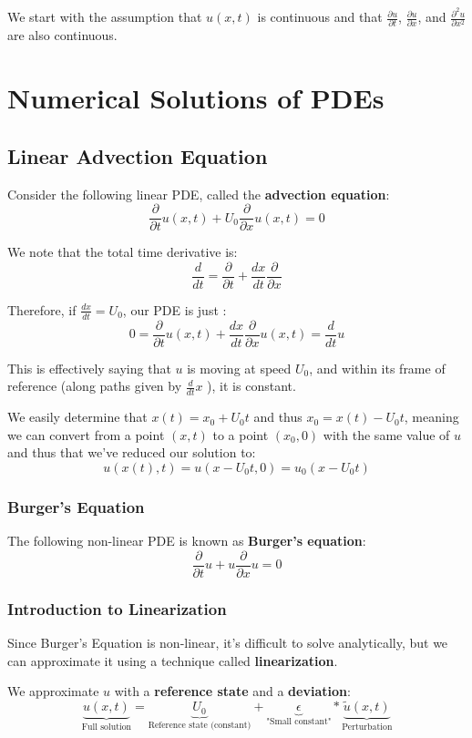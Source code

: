 \documentclass{article}
\begin{document}
We start with the assumption that \(u(x,t)\) is continuous and that \(\frac{\partial u}{\partial t}\), \(\frac{\partial u}{\partial x}\), and 
\(\frac{\partial^2 u}{\partial x^2}\) are also continuous.     

\section{Numerical Solutions of PDEs}
\subsection{Linear Advection Equation}

Consider the following linear PDE, called the \textbf{advection equation}:
\[
    \frac{\partial}{\partial t}u(x,t)+U_0\frac{\partial}{\partial x}u(x,t)=0
\]

We note that the total time derivative is:
\[
    \frac{d}{dt}=\frac{\partial}{\partial t}+\frac{dx}{dt}\frac{\partial}{\partial x}
\]

Therefore, if \(\frac{dx}{dt}=U_0\), our PDE is just :
\[
  0=\frac{\partial}{\partial t}u(x,t)+\frac{dx}{dt}\frac{\partial}{\partial x}u(x,t)=\frac{d}{dt}u
\]

This is effectively saying that \(u\) is moving at speed \(U_0\), and within its frame of reference 
(along paths given by \(\frac{d}{dt}x\) ), it is constant.

We easily determine that \(x(t)=x_0+U_0t\) and thus \(x_0=x(t)-U_0t\), meaning we can convert from a point \((x,t)\) to a point \((x_0, 0)\) with the same 
value of \(u\) and thus that we've reduced our solution to:
\[
    u(x(t), t)=u(x-U_0t,0)=u_0(x-U_0t)
\]    
\subsubsection{Burger's Equation}

The following non-linear PDE is known as \textbf{Burger's equation}:
\[
    \frac{\partial}{\partial t}u+u\frac{\partial}{\partial x}u=0
\]

\subsubsection{Introduction to Linearization}

Since Burger's Equation is non-linear, it's difficult to solve analytically, but we can approximate it using a technique called \textbf{linearization}. 

We approximate \(u\) with a \textbf{reference state} and a \textbf{deviation}:
\[
    \underbrace{u(x,t)}_\text{Full solution}=\underbrace{U_0}_{\text{Reference state (constant)}}+\underbrace{\epsilon}_\text{"Small constant"}*\underbrace{\tilde{u}(x,t)}_{\text{Perturbation}}
\]
\end{document}
